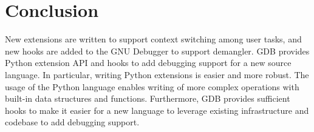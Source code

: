 \chapter{Conclusion}
New extensions are written to support context switching among \uCCS user tasks, and
new hooks are added to the GNU
Debugger to support \CFAS demangler. GDB provides Python extension API and hooks to add debugging support for a
new source language. In particular, writing Python extensions is easier and more
robust. The usage of the Python language enables writing of
more complex operations with built-in data structures and functions.
Furthermore, GDB provides sufficient hooks to make it easier for a new language to leverage existing
infrastructure and codebase to add debugging support.
